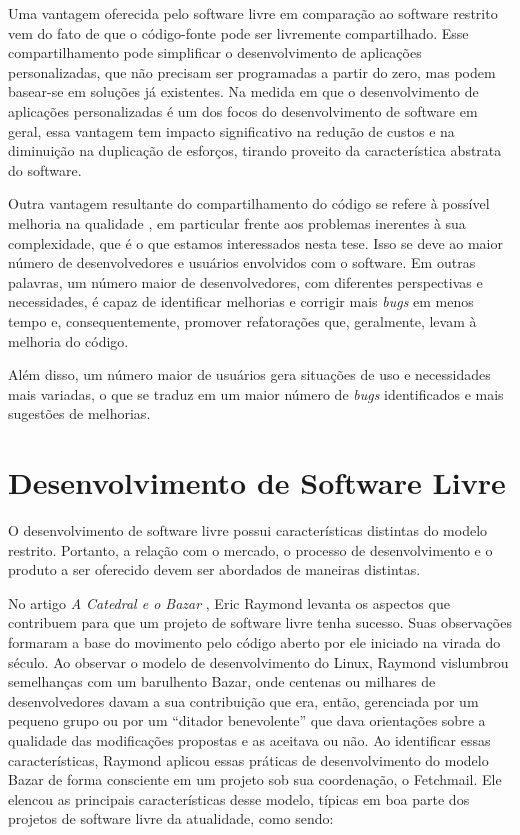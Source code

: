 
Uma vantagem oferecida pelo software livre em comparação ao software
restrito vem do fato de que o código-fonte pode ser livremente compartilhado.
%
Esse compartilhamento pode simplificar o desenvolvimento de aplicações
personalizadas, que não precisam ser programadas a partir do zero, mas
podem basear-se em soluções já existentes.
%
Na medida em que o desenvolvimento de aplicações personalizadas é um dos focos do
desenvolvimento de software em geral, essa vantagem tem impacto significativo na
redução de custos e na diminuição na duplicação de esforços, tirando proveito da
característica abstrata do software.

Outra vantagem resultante do compartilhamento do código se refere
à possível melhoria na qualidade \citep{CatedralBazzar}, em particular frente aos
problemas inerentes à sua complexidade, que é o que estamos interessados
nesta tese.
%
Isso se deve ao maior número de desenvolvedores e usuários envolvidos
com o software. Em outras palavras, um número maior de desenvolvedores, com diferentes
perspectivas e necessidades, é capaz de identificar melhorias e corrigir
mais \emph{bugs} em menos tempo e, consequentemente, promover refatorações que,
geralmente, levam à melhoria do código.

%
Além disso, um número maior de usuários gera situações de uso e
necessidades mais variadas, o que se traduz em um maior número
de \emph{bugs} identificados e mais sugestões de melhorias.


\section{Desenvolvimento de Software Livre}

O desenvolvimento de software livre possui características distintas do
modelo restrito. Portanto, a relação com o mercado, o processo de
desenvolvimento e o produto a ser oferecido devem ser abordados de maneiras
distintas.

No artigo \emph{A Catedral e o Bazar} \citep{CatedralBazzar}, Eric Raymond
levanta os aspectos que contribuem para que um projeto de software
livre tenha sucesso. Suas observações formaram a base do movimento pelo
código aberto por ele iniciado na virada do século.
% 
Ao observar o modelo de desenvolvimento do Linux, Raymond vislumbrou semelhanças
com um barulhento Bazar, onde centenas ou milhares de desenvolvedores davam a
sua contribuição que era, então, gerenciada por um pequeno grupo ou por
um ``ditador benevolente'' que dava orientações sobre a qualidade das
modificações propostas e as aceitava ou não.
%
Ao identificar essas características, Raymond aplicou essas práticas de
desenvolvimento do modelo Bazar de forma consciente em um projeto sob sua
coordenação, o Fetchmail. Ele elencou as principais características desse modelo,
típicas em boa parte dos projetos de software livre da atualidade, como sendo:

